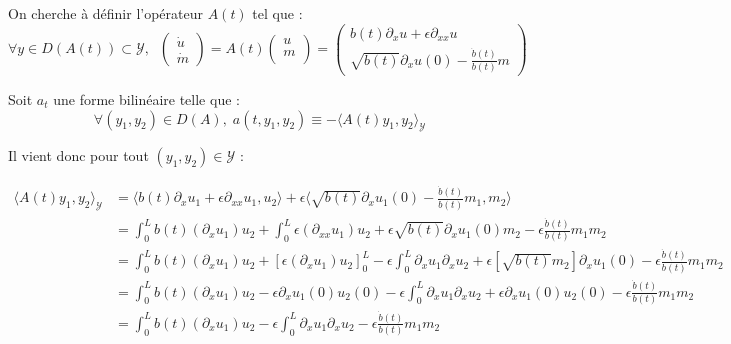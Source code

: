 \documentclass[a4paper]{article}
\newcommand{\dep}{b}
\begin{document}
\begin{preuve}
 On cherche à définir l'opérateur $A(t)$ tel que :
 \[ \forall y \in D(A(t)) \subset \mathscr{Y}, \; \; 
 \left( \begin{array}{c}
 \dot{u}\\
 \dot{m}
 \end{array} \right)
 = A(t) \left( \begin{array}{c}
 u\\
 m\\
 \end{array} \right) 
 = \left(\begin{array}{c}
 \dep(t) \partial_x u + \epsilon \partial_{xx} u\\
 \sqrt{\dep(t)} \partial_x u(0) - \displaystyle \frac{\dot{\dep}(t)}{\dep(t)}m
 \end{array}\right) \]
 
 Soit $a_t$ une forme bilinéaire telle que :
 \[ \forall (y_1,y_2) \in D(A), \; 
 a(t,y_1,y_2) \equiv - \langle A(t) y_1,y_2\rangle_{\mathscr{Y}} \]

 Il vient donc pour tout $(y_1,y_2) \in \mathscr{Y}$ :

 \[
 \begin{split}
 	\langle A(t) y_1,y_2\rangle_{\mathscr{Y}} 
	                   & =  \langle \dep (t) \partial_x u_1 + \epsilon \partial_{xx}u_1 ,u_2\rangle
 					  + \epsilon \langle \sqrt{\dep(t)} \partial_x u_1(0) 
					                     - \displaystyle \frac{\dot{\dep}(t)}{\dep(t)}m_1 ,m_2 \rangle \\	
                         &= \int_0^L \dep (t) (\partial_x u_1)u_2
                            + \int_0^L \epsilon (\partial_{xx} u_1)u_2
							+ \epsilon \sqrt{\dep(t)} \partial_x u_1(0)m_2 
                             - \epsilon \displaystyle \frac{\dot{\dep}(t)}{\dep(t)}m_1m_2\\
 						& =   \int_0^L \dep(t) (\partial_xu_1)u_2
 						   + [\epsilon (\partial_x u_1)u_2]_0^L 
 						  - \epsilon \int_0^L \partial_xu_1 \partial_xu_2
						+ \epsilon [\sqrt{\dep(t)}m_2]  \partial_x u_1(0)
                           - \epsilon \displaystyle \frac{\dot{\dep}(t)}{\dep(t)}m_1m_2\\
 						& = \int_0^L \dep (t) (\partial_xu_1)u_2
						   - \epsilon \partial_xu_1(0)u_2(0)
						    -  \epsilon\int_0^L \partial_xu_1 \partial_xu_2
   						+ \epsilon \partial_xu_1(0) u_2(0) 
                         - \epsilon \displaystyle \frac{\dot{\dep}(t)}{\dep(t)}m_1m_2\\
  						& = \int_0^L \dep (t) (\partial_xu_1)u_2
						 - \epsilon \int_0^L \partial_xu_1 \partial_xu_2
                          - \epsilon \displaystyle \frac{\dot{\dep}(t)}{\dep(t)}m_1m_2   
\end{split}
\]

\end{preuve}
\end{document}
